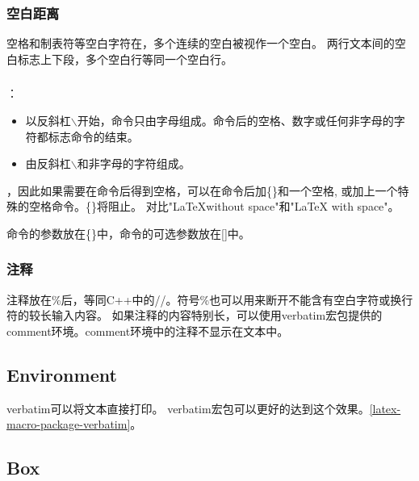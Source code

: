 \documentclass[a4paper,11pt,oneside,openany]{book}
\begin{document}
\begin{CJK*}{GBK}{song}
\subsubsection{空白距离}
空格和制表符等空白字符在，多个连续的空白被视作一个空白。
两行文本间的空白标志上下段，多个空白行等同一个空白行。

\subsubsection{}
：
\begin{itemize}
\item 以反斜杠$\backslash$开始，命令只由字母组成。命令后的空格、数字或任何非字母的字符都标志命令的结束。
\item 由反斜杠$\backslash$和非字母的字符组成。
\end{itemize}
，因此如果需要在命令后得到空格，可以在命令后加\{\}和一个空格,
或加上一个特殊的空格命令。\{\}将阻止。
对比"\LaTeX without space"和"\LaTeX{} with space"。

命令的参数放在\{\}中，命令的可选参数放在[]中。

\subsubsection{注释}
注释放在\%后，等同C++中的//。符号\%也可以用来断开不能含有空白字符或换行符的较长输入内容。
如果注释的内容特别长，可以使用verbatim宏包提供的comment环境。comment环境中的注释不显示在文本中。


\subsection{Environment}

verbatim可以将文本直接打印。
verbatim宏包可以更好的达到这个效果。\ref{latex-macro-package-verbatim}。


\subsection{Box}
\par
{}\par
{}\par
{}\par
{}\par
{}\par


\end{CJK*}
\end{document}
